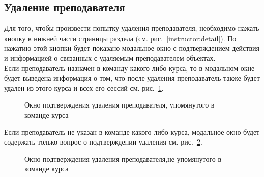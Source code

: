 \subsection{Удаление преподавателя}\label{instructor:delete_section}
Для того, чтобы произвести попытку удаления преподавателя, необходимо нажать кнопку  в нижней части страницы раздела  (см. рис.~\ref{instructor:detail}). По нажатию этой кнопки будет показано модальное окно с подтверждением действия и информацией о связанных с удаляемым преподавателем объектах.\\
Если преподаватель назначен в команду какого-либо курса, то в модальном окне будет выведена информация о том, что после удаления преподаватель также будет удален из этого курса и всех его сессий см. рис.~\ref{instructor:del_with_courses}.

\begin{figure}[H]
	\caption{Окно подтверждения удаления преподавателя, упомянутого в команде курса}
	\label{instructor:del_with_courses}
\end{figure}

Если преподаватель не указан в команде какого-либо курса, модальное окно будет содержать только вопрос о подтверждении удаления см. рис.~\ref{instructor:del_no_courses}.

\begin{figure}[H]
	\caption{Окно подтверждения удаления преподавателя,не упомянутого в команде курса}
	\label{instructor:del_no_courses}
\end{figure}

